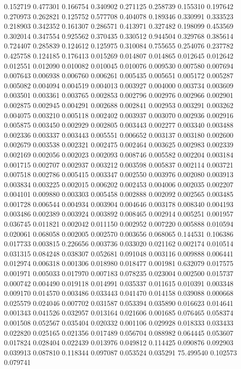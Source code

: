 0.152719
0.477301
0.166754
0.340902
0.271125
0.258739
0.155310
0.197642
0.270973
0.262821
0.125752
0.577708
0.404078
0.189346
0.330991
0.333523
0.218903
0.342352
0.161307
0.286571
0.413971
0.327482
0.198099
0.453569
0.302014
0.347554
0.925562
0.370435
0.330512
0.944504
0.329768
0.385614
0.724407
0.285839
0.124612
0.125975
0.310084
0.755655
0.254076
0.237782
0.425758
0.124185
0.176413
0.015269
0.014807
0.014865
0.012645
0.012642
0.012551
0.012090
0.010082
0.010045
0.010076
0.009530
0.007580
0.007694
0.007643
0.006938
0.006760
0.006261
0.005435
0.005651
0.005172
0.005287
0.005082
0.004094
0.004519
0.004013
0.003927
0.004000
0.003734
0.003609
0.003501
0.003361
0.003765
0.002853
0.002796
0.002976
0.002966
0.002901
0.002875
0.002945
0.004291
0.002688
0.002841
0.002953
0.003291
0.003262
0.004075
0.003210
0.005118
0.002402
0.003937
0.003070
0.002936
0.002916
0.005875
0.003450
0.002929
0.002805
0.003443
0.002277
0.003340
0.003488
0.002336
0.003337
0.003443
0.005551
0.006652
0.003137
0.003180
0.002600
0.002679
0.003538
0.002321
0.002475
0.002464
0.003625
0.002983
0.002339
0.002169
0.002056
0.002023
0.002093
0.008746
0.005582
0.002204
0.003184
0.001715
0.002707
0.002937
0.003212
0.003598
0.005837
0.002114
0.003721
0.007518
0.002786
0.005415
0.003347
0.002550
0.003976
0.002080
0.003913
0.003834
0.003225
0.002015
0.006202
0.002453
0.004006
0.002035
0.002207
0.004101
0.009880
0.003303
0.005458
0.002888
0.002092
0.002565
0.003485
0.001728
0.006544
0.004934
0.003904
0.004646
0.003178
0.008340
0.004193
0.003486
0.002389
0.003924
0.003892
0.008465
0.002914
0.005251
0.001957
0.036745
0.011821
0.002042
0.011150
0.002952
0.007220
0.005888
0.010594
0.020061
0.068058
0.002005
0.002570
0.003656
0.068065
0.144531
0.106386
0.017733
0.003815
0.226656
0.003736
0.033020
0.021162
0.002174
0.010514
0.031315
0.084248
0.038307
0.052681
0.091048
0.003116
0.009888
0.006441
0.012974
0.006318
0.001306
0.018980
0.018477
0.001981
0.632079
0.017575
0.001971
0.005033
0.017970
0.007183
0.078235
0.023004
0.002500
0.015737
0.000742
0.004490
0.019118
0.014991
0.035337
0.011615
0.010391
0.003348
0.009170
0.014570
0.003486
0.033443
0.041470
0.014158
0.039088
0.000668
0.025579
0.024046
0.007702
0.031587
0.053394
0.035890
0.016623
0.014641
0.001343
0.041526
0.032957
0.013164
0.021606
0.001685
0.076465
0.058374
0.001508
0.052567
0.035404
0.020332
0.001106
0.029928
0.018333
0.033433
0.022820
0.025165
0.021356
0.017489
0.056704
0.088982
0.064445
0.053607
0.017824
0.028404
0.022439
0.013976
0.049812
0.114425
0.090876
0.092903
0.039913
0.087810
0.118344
0.097087
0.053524
0.035291
75.499540
0.102573
0.079741
